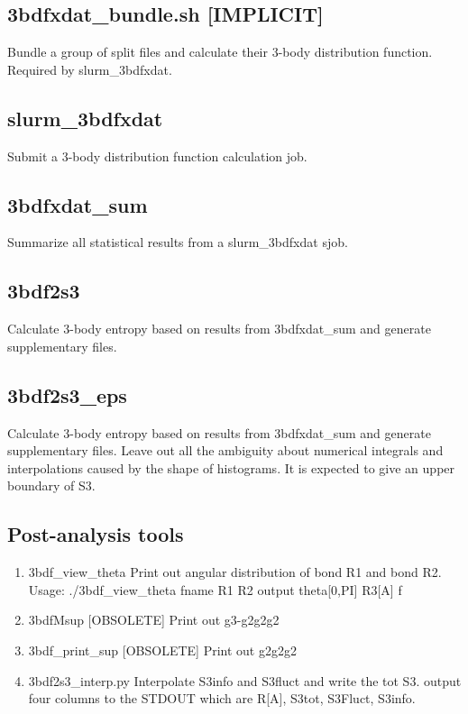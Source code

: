 \documentclass[11pt]{article}
\begin{document}
\subsection{3bdfxdat\_bundle.sh [IMPLICIT]}
\label{sec:orgb1aceea}
Bundle a group of split files and calculate their 3-body distribution function. Required by slurm\_3bdfxdat.

\subsection{slurm\_3bdfxdat}
\label{sec:org3cdd7e3}
Submit a 3-body distribution function calculation job. 

\subsection{3bdfxdat\_sum}
\label{sec:org2f0d88e}
Summarize all statistical results from a slurm\_3bdfxdat sjob.

\subsection{3bdf2s3}
\label{sec:orgb974f79}
Calculate 3-body entropy based on results from 3bdfxdat\_sum and
generate supplementary files.

\subsection{3bdf2s3\_eps}
\label{sec:orgc3666e0}
Calculate 3-body entropy based on results from 3bdfxdat\_sum and
generate supplementary files. Leave out all the ambiguity about
numerical integrals and interpolations caused by the shape of
histograms. It is expected to give an upper boundary of S3.

\subsection{Post-analysis tools}
\label{sec:org077ce83}
\begin{enumerate}
\item 3bdf\_view\_theta
Print out angular distribution of bond R1 and bond R2.
Usage:
./3bdf\_view\_theta fname R1 R2
output
theta[0,PI] R3[A] f
\item 3bdfMsup [OBSOLETE] 
Print out g3-g2g2g2
\item 3bdf\_print\_sup [OBSOLETE]
Print out g2g2g2
\item 3bdf2s3\_interp.py
Interpolate S3info and S3fluct and write the tot S3.
output four columns to the STDOUT which are R[A], S3tot, S3Fluct, S3info.
\end{enumerate}
\end{document}
